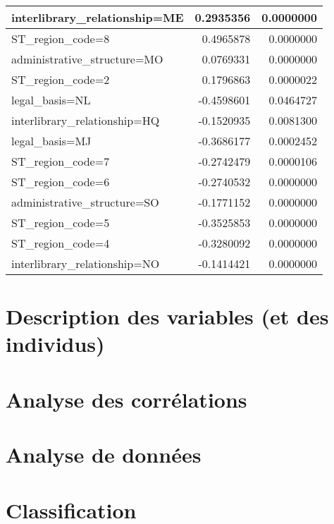 \documentclass[14pt,]{article}
\begin{document}
\begin{table}
\begin{table}
\begin{tabular}[t]{l|r|r}
\hline
interlibrary\_relationship=ME & 0.2935356 & 0.0000000\\
\hline
ST\_region\_code=8 & 0.4965878 & 0.0000000\\
\hline
administrative\_structure=MO & 0.0769331 & 0.0000000\\
\hline
ST\_region\_code=2 & 0.1796863 & 0.0000022\\
\hline
legal\_basis=NL & -0.4598601 & 0.0464727\\
\hline
interlibrary\_relationship=HQ & -0.1520935 & 0.0081300\\
\hline
legal\_basis=MJ & -0.3686177 & 0.0002452\\
\hline
ST\_region\_code=7 & -0.2742479 & 0.0000106\\
\hline
ST\_region\_code=6 & -0.2740532 & 0.0000000\\
\hline
administrative\_structure=SO & -0.1771152 & 0.0000000\\
\hline
ST\_region\_code=5 & -0.3525853 & 0.0000000\\
\hline
ST\_region\_code=4 & -0.3280092 & 0.0000000\\
\hline
interlibrary\_relationship=NO & -0.1414421 & 0.0000000\\
\hline
\end{tabular}
\end{table}
\end{table}

\hypertarget{description-des-variables-et-des-individus}{%
\section{Description des variables (et des
individus)}\label{description-des-variables-et-des-individus}}

\hypertarget{analyse-des-corruxe9lations}{%
\section{Analyse des corrélations}\label{analyse-des-corruxe9lations}}

\hypertarget{analyse-de-donnuxe9es}{%
\section{Analyse de données}\label{analyse-de-donnuxe9es}}

\hypertarget{classification}{%
\section{Classification}\label{classification}}
\end{document}
